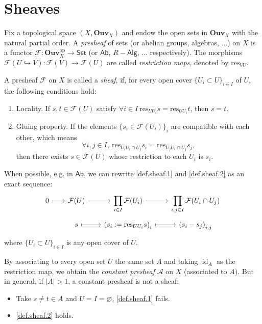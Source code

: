 \section{Sheaves}

\begin{definition}
Fix a topological space $(X,\mathbf{Ouv}_X)$ and endow the open sets in $\mathbf{Ouv}_X$ with the natural partial order. A \emph{presheaf} of sets (or abelian groups, algebras, ...) on $X$ is a functor $\mathcal{F}:\mathbf{Ouv}_X^\mathrm{op}\to\mathsf{Set}$ (or $\mathsf{Ab}$, $R-\mathsf{Alg}$, ... respectively). 
The morphisms $\mathcal{F}(U\hookrightarrow V):\mathcal{F}(V)\to\mathcal{F}(U)$ are called \emph{restriction maps}, denoted by $\mathrm{res}_{VU}$. 
\end{definition}

\begin{definition}
A presheaf $\mathcal{F}$ on $X$ is called a \emph{sheaf}, if, for every open cover $\{U_i\subset U\}_{i\in I}$ of $U$, the following conditions hold:
\begin{enumerate}[label=S.\arabic*, series=sheaf]
    \item\label{def.sheaf.1} Locality. If $s, t\in\mathcal{F}(U)$ satisfy $\forall i\in I\ \mathrm{res}_{UU_i}s=\mathrm{res}_{UU_i}t$, then $s=t$.
    \item\label{def.sheaf.2} Gluing property. If the elements $\{s_i\in\mathcal{F}(U_i)\}_i$ are compatible with each other, which means 
    $$\forall i,j\in I,\ \mathrm{res}_{U_iU_i\cap U_j}s_i=\mathrm{res}_{U_jU_i\cap U_j}s_j,$$
    then there exists $s\in\mathcal{F}(U)$ whose restriction to each $U_i$ is $s_i$.
\end{enumerate}
\end{definition}

When possible, e.g. in $\mathsf{Ab}$, we can rewrite \ref{def.sheaf.1} and \ref{def.sheaf.2} as an exact sequence:
\[\begin{tikzcd}[row sep=tiny, column sep=scriptsize]
    0 \arrow{r} & \mathcal{F}(U) \arrow{r} & \displaystyle\prod_{i\in I}\mathcal{F}(U_i) \arrow{r} & \displaystyle\prod_{i,j\in I}\mathcal{F}(U_i\cap U_j) \\
    & s \arrow[mapsto]{r} & \left(s_i:=\mathrm{res}_{UU_i}s\right)_i \arrow[r, mapsto] & \left(s_i-s_j\right)_{i,j} 
\end{tikzcd}\]
where $\{U_i\subset U\}_{i\in I}$ is any open cover of $U$. 

\begin{example}
    By associating to every open set $U$ the same set $A$ and taking $\operatorname{id}_A$ as the restriction map, we obtain the \emph{constant presheaf} $\mathcal{A}$ on $X$ (associated to $A$).
    But in general, if $|A|>1$, a constant presheaf is not a sheaf:
    \begin{itemize}
        \item Take $s\neq t\in A$ and $U=I=\varnothing$, 
        \ref{def.sheaf.1} fails.
        \item \ref{def.sheaf.2} holds.
    \end{itemize}
\end{example}


